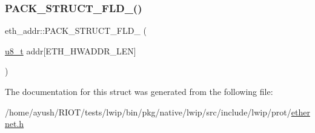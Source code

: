 \mbox{\label{structeth__addr_acafa3550b2f9a0b45c11b17b280fb8cb}} 
\subsubsection{\texorpdfstring{P\+A\+C\+K\+\_\+\+S\+T\+R\+U\+C\+T\+\_\+\+F\+L\+D\+\_()}{PACK\_STRUCT\_FLD\_8()}\hspace{0.1cm}{\footnotesize\ttfamily [2/2]}}
{\footnotesize\ttfamily eth\+\_\+addr\+::\+P\+A\+C\+K\+\_\+\+S\+T\+R\+U\+C\+T\+\_\+\+F\+L\+D\+\_ (\begin{DoxyParamCaption}\item[{\hyperlink{group__compiler__abstraction_ga4caecabca98b43919dd11be1c0d4cd8e}{u8\+\_\+t}}]{addr\mbox{[}\+E\+T\+H\+\_\+\+H\+W\+A\+D\+D\+R\+\_\+\+L\+E\+N\mbox{]} }\end{DoxyParamCaption})}



The documentation for this struct was generated from the following file\+:\begin{DoxyCompactItemize}
\item 
/home/ayush/\+R\+I\+O\+T/tests/lwip/bin/pkg/native/lwip/src/include/lwip/prot/\hyperlink{native_2lwip_2src_2include_2lwip_2prot_2ethernet_8h}{ethernet.\+h}\end{DoxyCompactItemize}

